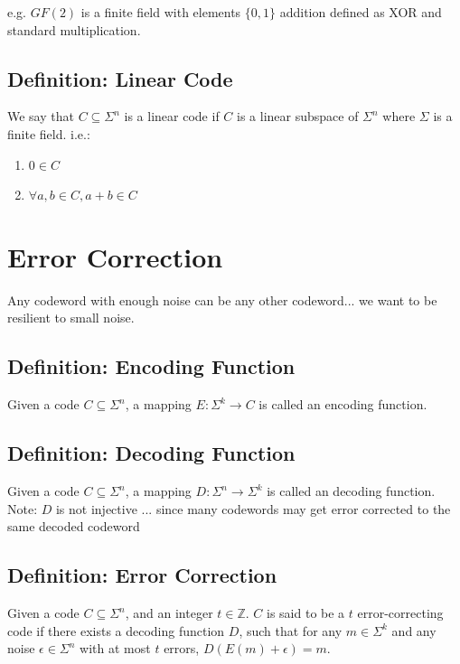 \documentclass[12pt]{article}
\begin{document}
e.g. $GF(2)$ is a finite field with elements $ \{0, 1\}$ addition defined as XOR and standard multiplication.

\subsection{Definition: Linear Code}
We say that $C \subseteq \Sigma^n$ is a linear code if $C$  is a linear subspace of $\Sigma^n$ where $\Sigma$ is a finite field. i.e.:

\begin{enumerate}
  \item $0 \in C$
  \item $\forall a,b \in C, a+b \in C$ 
\end{enumerate}

\break

\section{Error Correction}

Any codeword with enough noise can be any other codeword... we want to be resilient to small noise. 

\subsection{Definition: Encoding Function}
Given a code $C \subseteq \Sigma^n$, a mapping $E: \Sigma^k \rightarrow C$ is called an encoding function.


\subsection{Definition: Decoding Function}
Given a code $C \subseteq \Sigma^n$, a mapping $D: \Sigma^n \rightarrow \Sigma^k$ is called an decoding function.\\ 
Note: $D$ is not injective ... since many codewords may get error corrected to the same decoded codeword 

\subsection{Definition: Error Correction}
Given a code $C \subseteq \Sigma^n$, and an integer $t \in \mathbb{Z}$. $C$ is said to be a $t$ error-correcting code if there exists a decoding function $D$, such that for any $m \in \Sigma^k$ and any noise $\epsilon \in \Sigma^n$ with at most $t$ errors, $D(E(m) + \epsilon) = m$.
\end{document}
